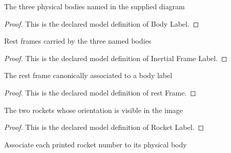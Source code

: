 \begin{definition}
  \label{def:physics:phyx-mini-0621:phyxminiproblems-problemphyxmini0621-bodylabel}
  The three physical bodies named in the supplied diagram
\end{definition}
\begin{proof}
  This is the declared model definition of Body Label.
\end{proof}
\begin{definition}
  \label{def:physics:phyx-mini-0621:phyxminiproblems-problemphyxmini0621-inertialframelabel}
  Rest frames carried by the three named bodies
\end{definition}
\begin{proof}
  This is the declared model definition of Inertial Frame Label.
\end{proof}
\begin{definition}
  \label{def:physics:phyx-mini-0621:phyxminiproblems-problemphyxmini0621-restframe}
  The rest frame canonically associated to a body label
\end{definition}
\begin{proof}
  This is the declared model definition of rest Frame.
\end{proof}
\begin{definition}
  \label{def:physics:phyx-mini-0621:phyxminiproblems-problemphyxmini0621-rocketlabel}
  The two rockets whose orientation is visible in the image
\end{definition}
\begin{proof}
  This is the declared model definition of Rocket Label.
\end{proof}
\begin{definition}
  \label{def:physics:phyx-mini-0621:phyxminiproblems-problemphyxmini0621-rocketbody}
  Associate each printed rocket number to its physical body
\end{definition}
